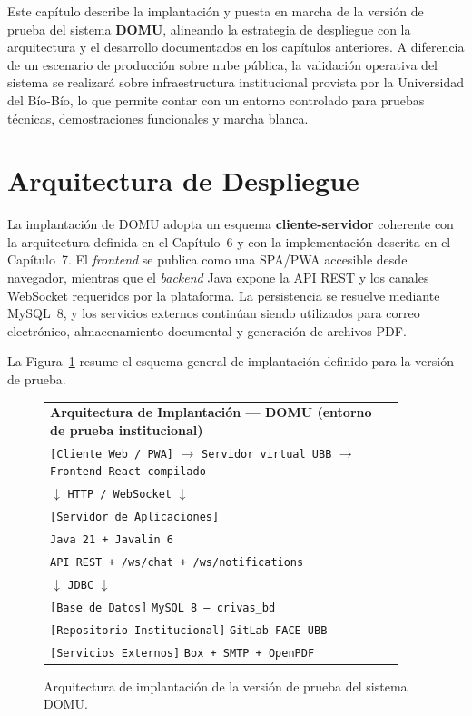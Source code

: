 Este capítulo describe la implantación y puesta en marcha de la versión de prueba del sistema \textbf{DOMU}, alineando la estrategia de despliegue con la arquitectura y el desarrollo documentados en los capítulos anteriores. A diferencia de un escenario de producción sobre nube pública, la validación operativa del sistema se realizará sobre infraestructura institucional provista por la Universidad del Bío-Bío, lo que permite contar con un entorno controlado para pruebas técnicas, demostraciones funcionales y marcha blanca.

\section{Arquitectura de Despliegue}

La implantación de DOMU adopta un esquema \textbf{cliente-servidor} coherente con la arquitectura definida en el Capítulo~6 y con la implementación descrita en el Capítulo~7. El \textit{frontend} se publica como una SPA/PWA accesible desde navegador, mientras que el \textit{backend} Java expone la API REST y los canales WebSocket requeridos por la plataforma. La persistencia se resuelve mediante MySQL~8, y los servicios externos continúan siendo utilizados para correo electrónico, almacenamiento documental y generación de archivos PDF.

La Figura~\ref{fig:despliegue} resume el esquema general de implantación definido para la versión de prueba.

\begin{figure}[H]
\centering
\begin{tabular}{|p{0.92\linewidth}|}
\hline
\textbf{Arquitectura de Implantación --- DOMU (entorno de prueba institucional)} \\[4pt]
\texttt{[Cliente Web / PWA]} $\longrightarrow$ \texttt{Servidor virtual UBB} $\longrightarrow$ \texttt{Frontend React compilado} \\[4pt]
\hfill $\downarrow$ \texttt{HTTP / WebSocket} $\downarrow$ \hfill \\[4pt]
\texttt{[Servidor de Aplicaciones]} \\
\quad \texttt{Java 21 + Javalin 6} \\
\quad \texttt{API REST + /ws/chat + /ws/notifications} \\[4pt]
\hfill $\downarrow$ \texttt{JDBC} $\downarrow$ \hfill \\[4pt]
\texttt{[Base de Datos]} \texttt{MySQL 8 --- crivas\_bd} \\[4pt]
\texttt{[Repositorio Institucional]} \texttt{GitLab FACE UBB} \\
\texttt{[Servicios Externos]} \texttt{Box + SMTP + OpenPDF} \\
\hline
\end{tabular}
\caption{Arquitectura de implantación de la versión de prueba del sistema DOMU.}
\label{fig:despliegue}
\end{figure}


